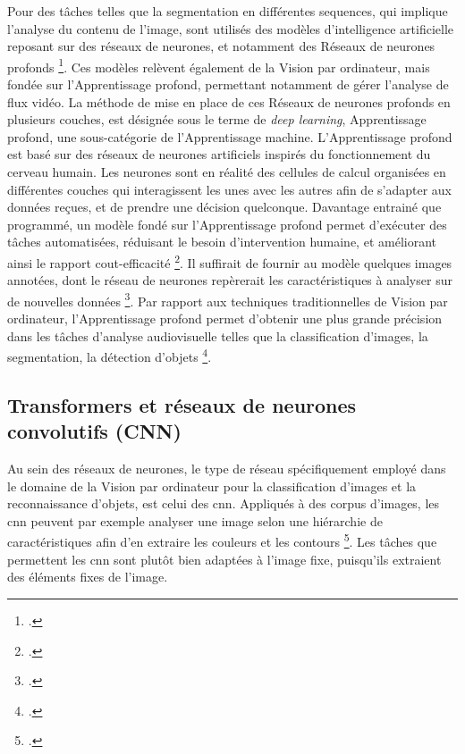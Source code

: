 Pour des tâches telles que la segmentation en différentes \gls{sequence}s, qui implique l’analyse du contenu de l’image, sont utilisés des modèles d’intelligence artificielle reposant sur des réseaux de neurones, et notamment des \gls{Réseaux de neurones profonds} \footcite{norindr2023}. Ces modèles relèvent également de la \gls{Vision par ordinateur}, mais fondée sur l'\gls{Apprentissage profond}, permettant notamment de gérer l'analyse de flux vidéo. La méthode de mise en place de ces \gls{Réseaux de neurones profonds} en plusieurs couches, est désignée sous le terme de \textit{deep learning}, \gls{Apprentissage profond}, une sous-catégorie de l'\gls{Apprentissage machine}. L'\gls{Apprentissage profond} est basé sur des réseaux de neurones artificiels inspirés du fonctionnement du cerveau humain. Les neurones sont en réalité des cellules de calcul organisées en différentes couches qui interagissent les unes avec les autres afin de s’adapter aux données reçues, et de prendre une décision quelconque. Davantage entrainé que programmé, un modèle fondé sur l’\gls{Apprentissage profond} permet d’exécuter des tâches automatisées, réduisant le besoin d'intervention humaine, et améliorant ainsi le rapport cout-efficacité \footcite{mahony2020}. Il suffirait de fournir au modèle quelques images annotées, dont le réseau de neurones repèrerait les caractéristiques à analyser sur de nouvelles données \footcite{mahony2020}. Par rapport aux techniques traditionnelles de \gls{Vision par ordinateur}, l'\gls{Apprentissage profond} permet d’obtenir une plus grande précision dans les tâches d'analyse audiovisuelle telles que la classification d'images, la segmentation, la détection d'objets \footcite{mahony2020}.

\subsection{Transformers et réseaux de neurones convolutifs (CNN)}

Au sein des réseaux de neurones, le type de réseau spécifiquement employé dans le domaine de la \gls{Vision par ordinateur} pour la classification d’images et la reconnaissance d’objets, est celui des \gls{cnn}. Appliqués à des corpus d’images, les \gls{cnn} peuvent par exemple analyser une image selon une hiérarchie de caractéristiques afin d’en extraire les couleurs et les contours \footcite{brachmann2017}. Les tâches que permettent les \gls{cnn} sont plutôt bien adaptées à l’image fixe, puisqu’ils extraient des éléments fixes de l’image.  

